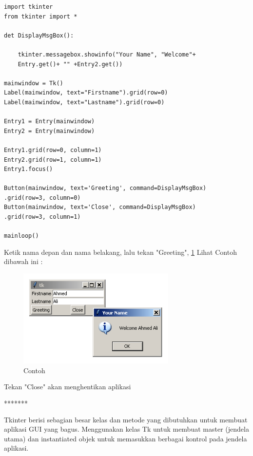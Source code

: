 \begin{verbatim}
import tkinter
from tkinter import *

det DisplayMsgBox():

    tkinter.messagebox.showinfo("Your Name", "Welcome"+ 
    Entry.get()+ "" +Entry2.get())

mainwindow = Tk()
Label(mainwindow, text="Firstname").grid(row=0)
Label(mainwindow, text="Lastname").grid(row=0)

Entry1 = Entry(mainwindow)
Entry2 = Entry(mainwindow)

Entry1.grid(row=0, column=1)
Entry2.grid(row=1, column=1)
Entry1.focus()

Button(mainwindow, text='Greeting', command=DisplayMsgBox)
.grid(row=3, column=0)
Button(mainwindow, text='Close', command=DisplayMsgBox)
.grid(row=3, column=1)

mainloop()
\end{verbatim}

\vspace{12pt}
Ketik nama depan dan nama belakang, lalu tekan "Greeting", \ref{Contoh} Lihat Contoh dibawah ini :
\begin{figure}[ht]
	\centerline{\includegraphics[width=0.70\textwidth]{figures/Contoh}}
	\caption{Contoh}
	\label{Contoh}
\end{figure}

\vspace{12pt}
Tekan "Close" akan menghentikan aplikasi 

*******

\vspace{12pt}
\hspace*{0.5in} Tkinter berisi sebagian besar kelas dan metode yang dibutuhkan untuk membuat aplikasi GUI yang bagus. Menggunakan kelas Tk untuk membuat master (jendela utama) dan instantiated objek untuk memasukkan berbagai kontrol pada jendela aplikasi.

